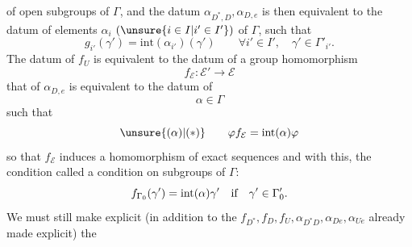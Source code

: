 

of open subgroups of $\Gamma$,
and the datum 
$\alpha_{D^*,D},\alpha_{D,e}$ is then equivalent
to the datum of elements $\alpha_i$
$(\unsure{i\in I|i'\in I'})$ of $\Gamma$,
such that
\[
g_{i'}(\gamma')=\mathrm{int}(\alpha_{i'})(\gamma')
\qquad\forall i'\in I',\quad\gamma'\in\Gamma'_{i'}.
\]
The datum of $f_U$ is equivalent to the datum of a group homomorphism
\[
\boxed{f_{\mathcal E}:\mathcal E'\to\mathcal E}
\]
that of $\alpha_{D,e}$ is equivalent to the datum of
\[
\boxed{\alpha\in\Gamma}
\]
such that
\[
\unsure{(\alpha)|(*)}\qquad
\varphi f_{\mathcal E}=\mathrm{int}(\alpha)\varphi
\]
so that $f_{\mathcal E}$ induces a homomorphism of exact sequences
and with this, the condition called \unsure{$(\alpha)$|$(*)$}
 a condition on
 subgroups of $\Gamma$:
\[
f_{\Gamma_0}(\gamma')=\mathrm{int}(\alpha)\gamma'
\quad\hbox{if}\quad\gamma'\in\Gamma'_0.
\]
We must still make explicit (in addition to the
$f_{D^*},f_D,f_U,\alpha_{D^*D},\alpha_{De},\alpha_{Ue}$
already made explicit) the
